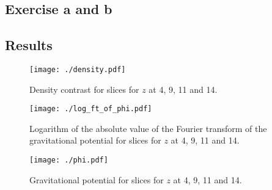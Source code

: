 

\subsection{Exercise a and b}



\newpage

\subsection{Results}

\begin{figure}[!ht]
  \hspace*{-1.7cm}
  \texttt{[image: ./density.pdf]}
  \caption{Density contrast for slices for $z$ at 4, 9, 11 and 14.}
  \label{fig:dens}
\end{figure}

\begin{figure}[!ht]
  \hspace*{-1.7cm}
  \texttt{[image: ./log\_ft\_of\_phi.pdf]}
  \caption{Logarithm of the absolute value of the Fourier transform of the gravitational potential for slices for $z$ at 4, 9, 11 and 14.}
  \label{fig:logphi}
\end{figure}

\begin{figure}[!ht]
  \hspace*{-1.7cm}
  \texttt{[image: ./phi.pdf]}
  \caption{Gravitational potential for slices for $z$ at 4, 9, 11 and 14.}
  \label{fig:phi}
\end{figure}

